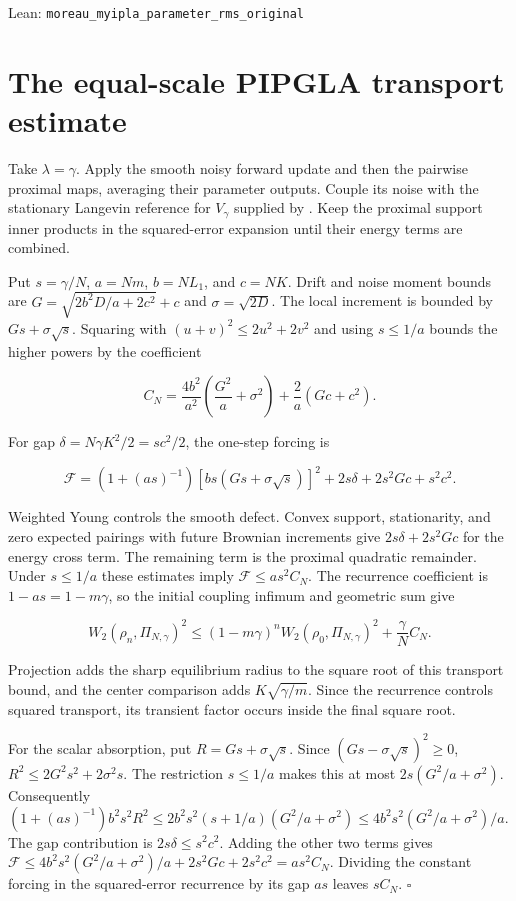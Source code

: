 \documentclass[11pt,a4paper]{article}
\begin{document}
\begin{leanbox}{Lean: \texttt{moreau\_\allowbreak{}myipla\_\allowbreak{}parameter\_\allowbreak{}rms\_\allowbreak{}original}}
\end{leanbox}

\section{\texorpdfstring{The equal-scale PIPGLA transport estimate}{The equal-scale PIPGLA transport estimate}}



Take \(\lambda=\gamma\). Apply the smooth noisy forward update and then the pairwise proximal maps, averaging their parameter outputs. Couple its noise with the stationary Langevin reference for \(V_\gamma\) supplied by \cite[Section~3.42.7]{LangevinLean2026ULASC}. Keep the proximal support inner products in the squared-error expansion until their energy terms are combined.



Put \(s=\gamma/N\), \(a=Nm\), \(b=NL_1\), and \(c=NK\). Drift and noise moment bounds are \(G=\sqrt{2b^2D/a+2c^2}+c\) and \(\sigma=\sqrt{2D}\). The local increment is bounded by \(Gs+\sigma\sqrt s\). Squaring with \((u+v)^2\le2u^2+2v^2\) and using \(s\le1/a\) bounds the higher powers by the coefficient

\[C_N=\frac{4b^2}{a^2}\left(\frac{G^2}{a}+\sigma^2\right)+\frac2a(Gc+c^2).\]

For gap \(\delta=N\gamma K^2/2=sc^2/2\), the one-step forcing is

\[\mathcal F=(1+(as)^{-1})[bs(Gs+\sigma\sqrt s)]^2+2s\delta+2s^2Gc+s^2c^2.\]

Weighted Young controls the smooth defect. Convex support, stationarity, and zero expected pairings with future Brownian increments give \(2s\delta+2s^2Gc\) for the energy cross term. The remaining term is the proximal quadratic remainder. Under \(s\le1/a\) these estimates imply \(\mathcal F\le as^2C_N\). The recurrence coefficient is \(1-a s=1-m\gamma\), so the initial coupling infimum and geometric sum give

\[W_2(\rho_n,\Pi_{N,\gamma})^2
\le(1-m\gamma)^nW_2(\rho_0,\Pi_{N,\gamma})^2+\frac\gamma N C_N.\]

Projection adds the sharp equilibrium radius to the square root of this transport bound, and the center comparison adds \(K\sqrt{\gamma/m}\). Since the recurrence controls squared transport, its transient factor occurs inside the final square root.




For the scalar absorption, put \(R=Gs+\sigma\sqrt s\). Since \((Gs-\sigma\sqrt s)^2\ge0\), \(R^2\le2G^2s^2+2\sigma^2s\). The restriction \(s\le1/a\) makes this at most \(2s(G^2/a+\sigma^2)\). Consequently \((1+(as)^{-1})b^2s^2R^2\le2b^2s^2(s+1/a)(G^2/a+\sigma^2)\le4b^2s^2(G^2/a+\sigma^2)/a\). The gap contribution is \(2s\delta\le s^2c^2\). Adding the other two terms gives \(\mathcal F\le4b^2s^2(G^2/a+\sigma^2)/a+2s^2Gc+2s^2c^2=as^2C_N\). Dividing the constant forcing in the squared-error recurrence by its gap \(as\) leaves \(sC_N\). \(\square\)
\end{document}
